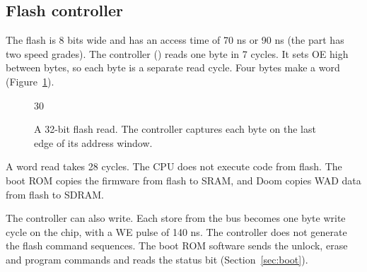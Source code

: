 \subsection{Flash controller}

The flash is 8 bits wide and has an access time of 70 ns or 90 ns (the part has two speed grades). The controller () reads one byte in 7 cycles. It sets OE high between bytes, so each byte is a separate read cycle. Four bytes make a word (Figure~\ref{fig:flrd}).

\begin{figure}[H]
  \centering
  \begin{waveform}[0.44cm]{30}
  \end{waveform}
  \caption{A 32-bit flash read. The controller captures each byte on the last edge of its address window.}
  \label{fig:flrd}
\end{figure}

A word read takes 28 cycles. The CPU does not execute code from flash. The boot ROM copies the firmware from flash to SRAM, and Doom copies WAD data from flash to SDRAM.

The controller can also write. Each store from the bus becomes one byte write cycle on the chip, with a WE pulse of 140 ns. The controller does not generate the flash command sequences. The boot ROM software sends the unlock, erase and program commands and reads the status bit (Section~\ref{sec:boot}).
